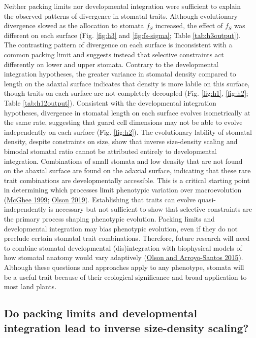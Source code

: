 \documentclass[
  12pt,
]{article}
\begin{document}
Neither packing limits nor developmental integration were sufficient to explain the observed patterns of divergence in stomatal traits. Although evolutionary divergence slowed as the allocation to stomata \(f_S\) increased, the effect of \(f_S\) was different on each surface (Fig. \ref{fig:h3} and \ref{fig:fs-sigma}; Table \ref{tab:h3output}). The contrasting pattern of divergence on each surface is inconsistent with a common packing limit and suggests instead that selective constraints act differently on lower and upper stomata. Contrary to the developmental integration hypotheses, the greater variance in stomatal density compared to length on the adaxial surface indicates that density is more labile on this surface, though traits on each surface are not completely decoupled (Fig. \ref{fig:h1}, \ref{fig:h2}; Table \ref{tab:h12output}). Consistent with the developmental integration hypotheses, divergence in stomatal length on each surface evolves isometrically at the same rate, suggesting that guard cell dimensions may not be able to evolve independently on each surface (Fig. \ref{fig:h2}). The evolutionary lability of stomatal density, despite constraints on size, show that inverse size-density scaling and bimodal stomatal ratio cannot be attributed entirely to developmental integration. Combinations of small stomata and low density that are not found on the abaxial surface are found on the adaxial surface, indicating that these rare trait combinations are developmentally accessible. This is a critical starting point in determining which processes limit phenotypic variation over macroevolution (\protect\hyperlink{ref-mcghee_theoretical_1999}{McGhee 1999}; \protect\hyperlink{ref-olson_plant_2019}{Olson 2019}). Establishing that traits can evolve quasi-independently is necessary but not sufficient to show that selective constraints are the primary process shaping phenotypic evolution. Packing limits and developmental integration may bias phenotypic evolution, even if they do not preclude certain stomatal trait combinations. Therefore, future research will need to combine stomatal developmental (dis)integration with biophysical models of how stomatal anatomy would vary adaptively (\protect\hyperlink{ref-olson_how_2015}{Olson and Arroyo-Santos 2015}). Although these questions and approaches apply to any phenotype, stomata will be a useful trait because of their ecological significance and broad application to most land plants.

\hypertarget{do-packing-limits-and-developmental-integration-lead-to-inverse-size-density-scaling}{%
\subsection{Do packing limits and developmental integration lead to inverse size-density scaling?}\label{do-packing-limits-and-developmental-integration-lead-to-inverse-size-density-scaling}}
\end{document}
